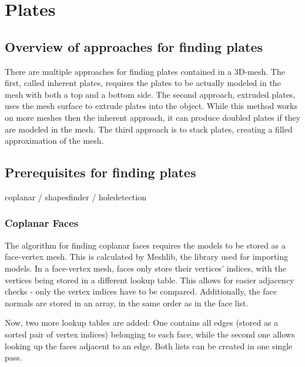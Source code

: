 \documentclass[../ClassicThesis.tex]{subfiles}
\begin{document}
\chapter{Plates}\label{ch:plates}

\section{Overview of approaches for finding plates}

There are multiple approaches for finding plates contained in a 3D-mesh. The first, called inherent plates, requires the plates to be actually modeled in the mesh with both a top and a bottom side. The second approach, extruded plates, uses the mesh surface to extrude plates into the object. While this method works on more meshes then the inherent approach, it can produce doubled plates if they are modeled in the mesh. The third approach is to stack plates, creating a filled approximation of the mesh.

\section{Prerequisites for finding plates}

coplanar / shapesfinder / holedetection

\subsection{Coplanar Faces}

The algorithm for finding coplanar faces requires the models to be stored as a face-vertex mesh. This is calculated by Meshlib, the library used for importing models. In a face-vertex mesh, faces only store their vertices' indices, with the vertices being stored in a different lookup table. This allows for easier adjacency checks - only the vertex indices have to be compared. Additionally, the face normals are stored in an array, in the same order as in the face list.

Now, two more lookup tables are added: One contains all edges (stored as a sorted pair of vertex indices) belonging to each face, while the second one allows looking up the faces adjacent to an edge. Both lists can be created in one single pass. 
\end{document}
